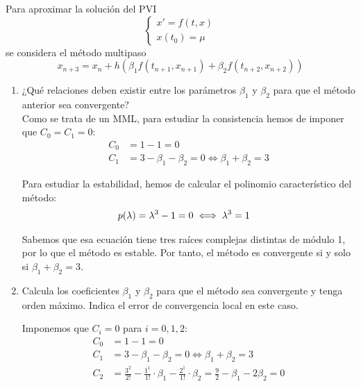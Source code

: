 \begin{ejercicio}\label{ej:3.2.7}
    Para aproximar la solución del PVI
    \begin{equation*}
        \begin{cases}
            x' = f(t, x) \\
            x(t_0) = \mu
        \end{cases}
    \end{equation*}
    se considera el método multipaso
    \begin{equation*}
        x_{n+3} = x_n + h \left( \beta_1 f(t_{n+1}, x_{n+1}) + \beta_2 f(t_{n+2}, x_{n+2}) \right)
    \end{equation*}
    \begin{enumerate}
        \item\label{ej:3.2.7.1}
        ¿Qué relaciones deben existir entre los parámetros $\beta_1$ y $\beta_2$ para que el método anterior sea convergente?\\
        
        Como se trata de un MML, para estudiar la consistencia hemos de imponer que $C_0=C_1=0$:
        \begin{align*}
            C_0 &= 1 - 1 = 0 \\
            C_1 &= 3 - \beta_1 - \beta_2 = 0 \iff \beta_1 + \beta_2 = 3
        \end{align*}

        Para estudiar la estabilidad, hemos de calcular el polinomio característico del método:
        \begin{align*}
            p(\lambda) &= \lambda^3 - 1 = 0\iff \lambda^3=1
        \end{align*}

        Sabemos que esa ecuación tiene tres raíces complejas distintas de módulo 1, por lo que el método es estable. Por tanto, el método es convergente si y solo si $\beta_1 + \beta_2 = 3$.


        \item \label{ej:3.2.7.2}Calcula los coeficientes $\beta_1$ y $\beta_2$ para que el método sea convergente y tenga orden máximo. Indica el error de convergencia local en este caso.
        
        Imponemos que $C_i=0$ para $i=0,1,2$:
        \begin{align*}
            C_0 &= 1 - 1 = 0 \\
            C_1 &= 3 - \beta_1 - \beta_2 = 0 \iff \beta_1 + \beta_2 = 3 \\
            C_2 &= \frac{3^2}{2!} - \frac{1^1}{1!}\cdot\beta_1 - \frac{2^1}{1!}\cdot\beta_2 = \frac{9}{2} - \beta_1 - 2\beta_2 = 0
        \end{align*}


\end{enumerate}
\end{ejercicio}
